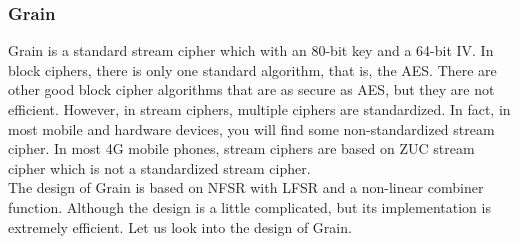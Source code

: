\documentclass[11pt]{article}
\begin{document}
\subsubsection{Grain}
Grain is a standard stream cipher which with an 80-bit key and a 64-bit IV. In block ciphers, there is only one standard algorithm, that is, the AES. There are other good block cipher algorithms that are as secure as AES, but they are not efficient. However, in stream ciphers, multiple ciphers are standardized. In fact, in most mobile and hardware devices, you will find some non-standardized stream cipher. In most 4G mobile phones, stream ciphers are based on ZUC stream cipher which is not a standardized stream cipher.\\
\newline
The design of Grain is based on NFSR with LFSR and a non-linear combiner function. Although the design is a little complicated, but its implementation is extremely efficient. Let us look into the design of Grain.
\end{document}

